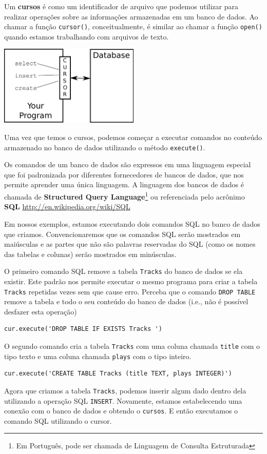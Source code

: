 Um {\bf cursos} é como um identificador de arquivo que podemos utilizar para
realizar operações sobre as informações armazenadas em um banco de dados. Ao
chamar a função {\tt cursor()}, conceitualmente, é similar ao chamar a função
{\tt open()} quando estamos trabalhando com arquivos de texto.

\beforefig
\centerline{\includegraphics[height=1.50in]{figs2/cursor.eps}}
\afterfig

Uma vez que temos o cursos, podemos começar a executar comandos no conteúdo
armazenado no banco de dados utilizando o método {\tt execute()}.

Os comandos de um banco de dados são expressos em uma linguagem especial que
foi padronizada por diferentes fornecedores de bancos de dados, que nos
permite aprender uma única linguagem. A linguagem dos bancos de dados é
chamada de {\bf Structured Query Language}\footnote{Em Português, pode ser
  chamada de Linguagem de Consulta Estruturada} ou referenciada pelo acrônimo
{\bf SQL}
\url{http://en.wikipedia.org/wiki/SQL}

Em nossos exemplos, estamos executando dois comandos SQL no banco de dados que
criamos. Convencionaremos que os comandos SQL serão mostrados em maiúsculas e
as partes que não são palavras reservadas do SQL (como os nomes das tabelas e
colunas) serão mostrados em minúsculas.

O primeiro comando SQL remove a tabela {\tt Tracks} do banco de dados se ela
existir. Este padrão nos permite executar o mesmo programa para criar a tabela
{\tt Tracks} repetidas vezes sem que cause erro. Perceba que o comando {\tt DROP
  TABLE} remove a tabela e todo o seu conteúdo do banco de dados (i.e., não é
possível desfazer esta operação)

\beforeverb
\begin{verbatim}
cur.execute('DROP TABLE IF EXISTS Tracks ')
\end{verbatim}
\afterverb
%
O segundo comando cria a tabela {\tt Tracks} com uma coluna chamada {\tt title}
com o tipo texto e uma coluna chamada {\tt plays} com o tipo inteiro.

\beforeverb
\begin{verbatim}
cur.execute('CREATE TABLE Tracks (title TEXT, plays INTEGER)')
\end{verbatim}
\afterverb
%
Agora que criamos a tabela {\tt Tracks}, podemos inserir algum dado dentro
dela utilizando a operação SQL {\tt INSERT}. Novamente, estamos
estabelecendo uma conexão com o banco de dados e obtendo o {\tt cursos}.
E então executamos o comando SQL utilizando o cursor.

